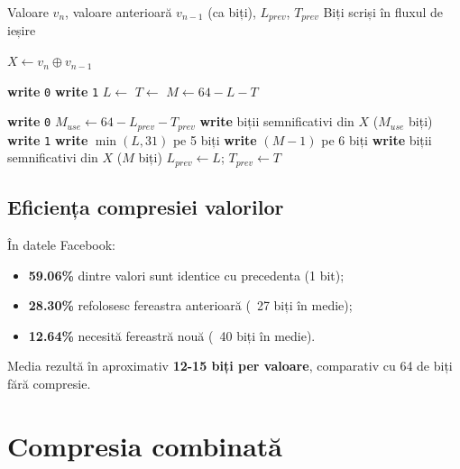 \begin{algorithm}[h]
\caption{Codare valoare cu XOR}
\label{alg:val-encode}
\begin{algorithmic}[1]
\Require Valoare $v_n$, valoare anterioară $v_{n-1}$ (ca biți), $L_{prev}$, $T_{prev}$
\Ensure Biți scriși în fluxul de ieșire

\State $X \gets v_n \oplus v_{n-1}$ 

    \State \textbf{write} \texttt{0} 
\Else
    \State \textbf{write} \texttt{1} 
    \State $L \gets$ 
    \State $T \gets$ 
    \State $M \gets 64 - L - T$

        \State \textbf{write} \texttt{0} 
        \State $M_{use} \gets 64 - L_{prev} - T_{prev}$
        \State \textbf{write} biții semnificativi din $X$ ($M_{use}$ biți)
    \Else
        \State \textbf{write} \texttt{1} 
        \State \textbf{write} $\min(L, 31)$ pe 5 biți
        \State \textbf{write} $(M - 1)$ pe 6 biți
        \State \textbf{write} biții semnificativi din $X$ ($M$ biți)
        \State $L_{prev} \gets L$; $T_{prev} \gets T$
    \EndIf
\EndIf
\end{algorithmic}
\end{algorithm}

\subsection{Eficiența compresiei valorilor}

În datele Facebook:
\begin{itemize}
    \item \textbf{59.06\%} dintre valori sunt identice cu precedenta (1 bit);
    \item \textbf{28.30\%} refolosesc fereastra anterioară (~27 biți în medie);
    \item \textbf{12.64\%} necesită fereastră nouă (~40 biți în medie).
\end{itemize}

Media rezultă în aproximativ \textbf{12-15 biți per valoare}, comparativ cu 64 de biți fără compresie.

\section{Compresia combinată}

